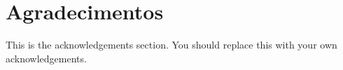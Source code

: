 \label{Agradecimentos}
\cleardoublepage
\section*{Agradecimentos}

This is the acknowledgements section.  You should replace this with your
own acknowledgements.

